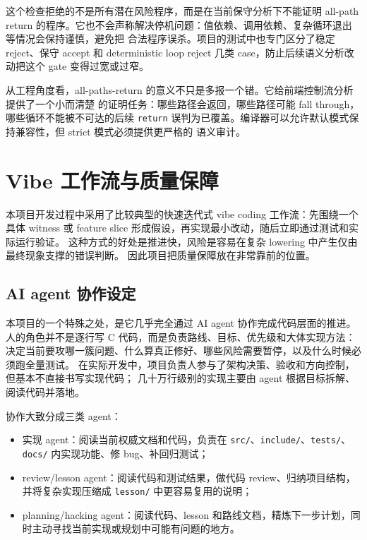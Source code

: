 \documentclass[UTF8,a4paper,11pt]{ctexart}
\begin{document}
这个检查拒绝的不是所有潜在风险程序，而是在当前保守分析下不能证明 all-path return
的程序。它也不会声称解决停机问题：值依赖、调用依赖、复杂循环退出等情况会保持谨慎，避免把
合法程序误杀。项目的测试中也专门区分了稳定 reject、保守 accept 和 deterministic loop reject
几类 case，防止后续语义分析改动把这个 gate 变得过宽或过窄。

从工程角度看，all-paths-return 的意义不只是多报一个错。它给前端控制流分析提供了一个小而清楚
的证明任务：哪些路径会返回，哪些路径可能 fall through，哪些循环不能被不可达的后续
\texttt{return} 误判为已覆盖。编译器可以允许默认模式保持兼容性，但 strict 模式必须提供更严格的
语义审计。

\section{Vibe 工作流与质量保障}

本项目开发过程中采用了比较典型的快速迭代式 vibe coding 工作流：先围绕一个具体
witness 或 feature slice 形成假设，再实现最小改动，随后立即通过测试和实际运行验证。
这种方式的好处是推进快，风险是容易在复杂 lowering 中产生仅由最终现象支撑的错误判断。
因此项目把质量保障放在非常靠前的位置。

\subsection{AI agent 协作设定}

本项目的一个特殊之处，是它几乎完全通过 AI agent 协作完成代码层面的推进。
人的角色并不是逐行写 C 代码，而是负责路线、目标、优先级和大体实现方法：
决定当前要攻哪一簇问题、什么算真正修好、哪些风险需要暂停，以及什么时候必须跑全量测试。
在实际开发中，项目负责人参与了架构决策、验收和方向控制，但基本不直接书写实现代码；
几十万行级别的实现主要由 agent 根据目标拆解、阅读代码并落地。

协作大致分成三类 agent：

\begin{itemize}
  \item 实现 agent：阅读当前权威文档和代码，负责在 \texttt{src/}、\texttt{include/}、\texttt{tests/}、\texttt{docs/} 内实现功能、修 bug、补回归测试；
  \item review/lesson agent：阅读代码和测试结果，做代码 review、归纳项目结构，并将复杂实现压缩成 \texttt{lesson/} 中更容易复用的说明；
  \item planning/hacking agent：阅读代码、lesson 和路线文档，精炼下一步计划，同时主动寻找当前实现或规划中可能有问题的地方。
\end{itemize}
\end{document}
